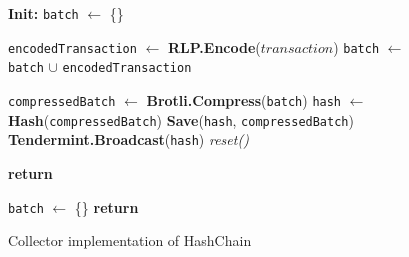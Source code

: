 \begin{figure}[t!]
  \begin{adjustbox}{minipage=[t]{\columnwidth}}
    \begin{algorithm}[H]
      \renewcommand{\thealgorithm}{Hash Collector}         
      \caption{\small Collector implementation of HashChain}%
      \label{alg:collector-hash}%
      \small
      \begin{algorithmic}[1]
            \State \textbf{Init:} \texttt{batch} $\leftarrow$ \{\}
      
            \label{alg3:add_tx}
            		\State \texttt{encodedTransaction} $\leftarrow$ \textbf{RLP.Encode}($transaction$)
				\State \texttt{batch} $\leftarrow$ \texttt{batch} $\cup$ \texttt{encodedTransaction}
            
             		\State \texttt{compressedBatch} $\leftarrow$  \textbf{Brotli.Compress}(\texttt{batch})
             		\State \texttt{hash} $\leftarrow$ \textbf{Hash}(\texttt{compressedBatch})
             		\State \textbf{Save}(\texttt{hash}, \texttt{compressedBatch})
                		\State \textbf{Tendermint.Broadcast}(\texttt{hash})
                		\State \textit{reset()}
                \EndIf
                	
                \State \textbf{return}
            \EndFunction
            
            \label{alg3:reset}
            		\State \texttt{batch} $\leftarrow$ \{\}
                \State \textbf{return}
            \EndFunction
        \end{algorithmic}
      \end{algorithm}
	\end{adjustbox}
  \end{figure}

